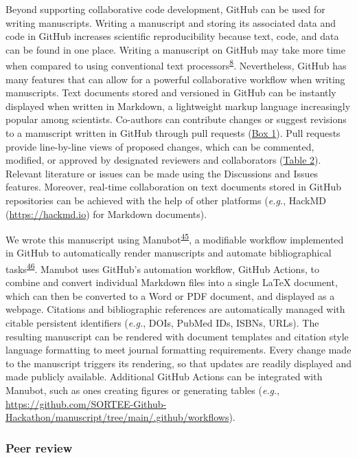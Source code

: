 Beyond supporting collaborative code development, GitHub can be used for writing manuscripts.
Writing a manuscript and storing its associated data and code in GitHub increases scientific reproducibility because text, code, and data can be found in one place.
Writing a manuscript on GitHub may take more time when compared to using conventional text processors\textsuperscript{\protect\hyperlink{ref-4ny1onB0}{8}}.
Nevertheless, GitHub has many features that can allow for a powerful collaborative workflow when writing manuscripts.
Text documents stored and versioned in GitHub can be instantly displayed when written in Markdown, a lightweight markup language increasingly popular among scientists.
Co-authors can contribute changes or suggest revisions to a manuscript written in GitHub through pull requests (\protect\hyperlink{definitions}{Box 1}).
Pull requests provide line-by-line views of proposed changes, which can be commented, modified, or approved by designated reviewers and collaborators (\protect\hyperlink{tbl:roles}{Table 2}).
Relevant literature or issues can be made using the Discussions and Issues features.
Moreover, real-time collaboration on text documents stored in GitHub repositories can be achieved with the help of other platforms (\emph{e.g.}, HackMD (\url{https://hackmd.io}) for Markdown documents).

We wrote this manuscript using Manubot\textsuperscript{\protect\hyperlink{ref-Re6Eg2va}{45}}, a modifiable workflow implemented in GitHub to automatically render manuscripts and automate bibliographical tasks\textsuperscript{\protect\hyperlink{ref-YuJbg3zO}{46}}.
Manubot uses GitHub's automation workflow, GitHub Actions, to combine and convert individual Markdown files into a single LaTeX document, which can then be converted to a Word or PDF document, and displayed as a webpage.
Citations and bibliographic references are automatically managed with citable persistent identifiers (\emph{e.g.}, DOIs, PubMed IDs, ISBNs, URLs).
The resulting manuscript can be rendered with document templates and citation style language formatting to meet journal formatting requirements.
Every change made to the manuscript triggers its rendering, so that updates are readily displayed and made publicly available.
Additional GitHub Actions can be integrated with Manubot, such as ones creating figures or generating tables (\emph{e.g.}, \url{https://github.com/SORTEE-Github-Hackathon/manuscript/tree/main/.github/workflows}).

\hypertarget{peer-review}{%
\subsubsection{Peer review}\label{peer-review}}

